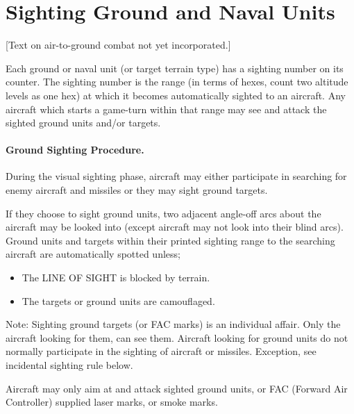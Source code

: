 \section{Sighting Ground and Naval Units}
\label{rule:sighting-ground-and-naval-units}

[Text on air-to-ground combat not yet incorporated.]

\iffalse

Each ground or naval unit (or target terrain type) has a sighting number on its counter. The sighting number is the range (in terms of hexes, count two altitude levels as one hex) at which it becomes automatically sighted to an aircraft. Any aircraft which starts a game-turn within that range may see and attack the sighted ground units and/or targets.

\paragraph{Ground Sighting Procedure.} During the visual sighting phase, aircraft may either participate in searching for enemy aircraft and missiles or they may sight ground targets.

If they choose to sight ground units, two adjacent angle-off arcs about the aircraft may be looked into (except aircraft may not look into their blind arcs). Ground units and targets within their printed sighting range to the searching aircraft are automatically spotted unless;

\begin{itemize}
    \item The LINE OF SIGHT is blocked by terrain.
    \item The targets or ground units are camouflaged.
\end{itemize}

Note: Sighting ground targets (or FAC marks) is an individual affair. Only the aircraft looking for them, can see them. Aircraft looking for ground units do not normally participate in the sighting of aircraft or missiles. Exception, see incidental sighting rule below.

Aircraft may only aim at and attack sighted ground units, or FAC (Forward Air Controller) supplied laser marks, or smoke marks.


